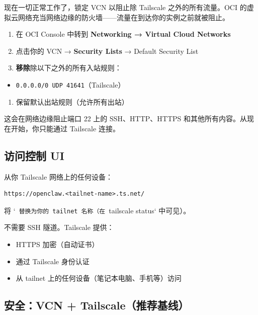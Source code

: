 现在一切正常工作了，锁定 VCN 以阻止除 Tailscale 之外的所有流量。OCI 的虚拟云网络充当网络边缘的防火墙——流量在到达你的实例之前就被阻止。

\begin{enumerate}
  \item 在 OCI Console 中转到 \textbf{Networking → Virtual Cloud Networks}
  \item 点击你的 VCN → \textbf{Security Lists} → Default Security List
  \item \textbf{移除}除以下之外的所有入站规则：
\end{enumerate}

\begin{itemize}
  \item \texttt{0.0.0.0/0 UDP 41641}（Tailscale）
\end{itemize}

\begin{enumerate}
  \item 保留默认出站规则（允许所有出站）
\end{enumerate}


这会在网络边缘阻止端口 22 上的 SSH、HTTP、HTTPS 和其他所有内容。从现在开始，你只能通过 Tailscale 连接。

\hrulefill


\subsection{访问控制 UI}


从你 Tailscale 网络上的任何设备：

\begin{lstlisting}
https://openclaw.<tailnet-name>.ts.net/
\end{lstlisting}


将 `\texttt{ 替换为你的 tailnet 名称（在 }tailscale status` 中可见）。

不需要 SSH 隧道。Tailscale 提供：

\begin{itemize}
  \item HTTPS 加密（自动证书）
  \item 通过 Tailscale 身份认证
  \item 从 tailnet 上的任何设备（笔记本电脑、手机等）访问
\end{itemize}


\hrulefill


\subsection{安全：VCN + Tailscale（推荐基线）}


